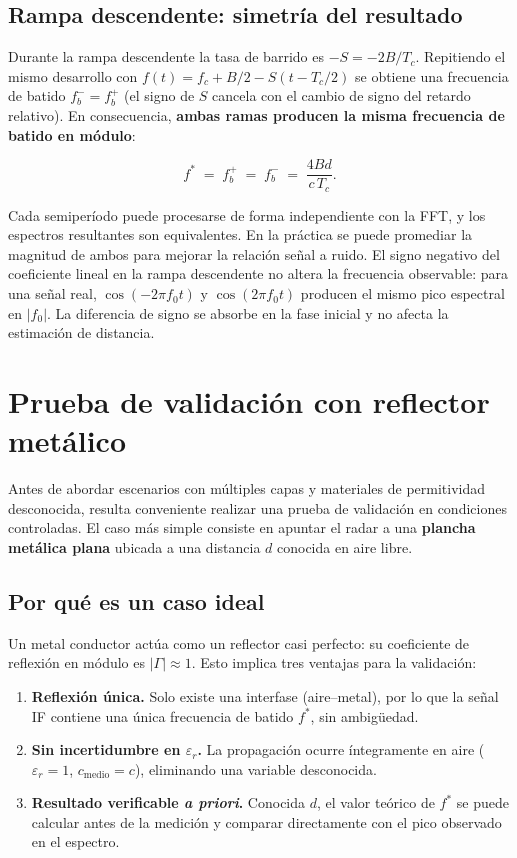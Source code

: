 \documentclass[12pt, a4paper, twoside]{report}
\begin{document}
\subsection*{Rampa descendente: simetría del resultado}

Durante la rampa descendente la tasa de barrido es $-S = -2B/T_c$.
Repitiendo el mismo desarrollo con $f(t) = f_c + B/2 - S(t-T_c/2)$
se obtiene una frecuencia de batido $f_b^- = f_b^+$ (el signo de $S$
cancela con el cambio de signo del retardo relativo). En consecuencia,
\textbf{ambas ramas producen la misma frecuencia de batido en módulo}:

\begin{equation}
  \boxed{
    f^* \;=\; f_b^+ \;=\; f_b^- \;=\; \frac{4Bd}{c\,T_c}.
  }
  \label{eq:beat_freq}
\end{equation}

Cada semiperíodo puede procesarse de forma independiente con
la FFT, y los espectros resultantes son equivalentes.
En la práctica se puede promediar la magnitud de ambos para
mejorar la relación señal a ruido.
El signo negativo del coeficiente lineal en la rampa descendente no altera la frecuencia observable: para una señal real, $\cos(-2\pi f_0 t)$ y $\cos(2\pi f_0 t)$ producen el mismo pico espectral en $\lvert f_0 \rvert$. La diferencia de signo se absorbe en la fase inicial y no afecta la estimación de distancia.

\section{Prueba de validación con reflector metálico}
\label{sec:prueba_metalica}

Antes de abordar escenarios con múltiples capas y materiales de
permitividad desconocida, resulta conveniente realizar una prueba
de validación en condiciones controladas. El caso más simple consiste
en apuntar el radar a una \textbf{plancha metálica plana} ubicada a
una distancia $d$ conocida en aire libre.

\subsection{Por qué es un caso ideal}

Un metal conductor actúa como un reflector casi perfecto: su
coeficiente de reflexión en módulo es $|\Gamma| \approx 1$. Esto
implica tres ventajas para la validación:

\begin{enumerate}
  \item \textbf{Reflexión única.} Solo existe una interfase
    (aire--metal), por lo que la señal IF contiene una única
    frecuencia de batido $f^*$, sin ambigüedad.
  \item \textbf{Sin incertidumbre en $\varepsilon_r$.} La propagación
    ocurre íntegramente en aire ($\varepsilon_r = 1$,
    $c_\text{medio} = c$), eliminando una variable desconocida.
  \item \textbf{Resultado verificable \textit{a priori}.} Conocida $d$,
    el valor teórico de $f^*$ se puede calcular antes de la medición
    y comparar directamente con el pico observado en el espectro.
\end{enumerate}
\end{document}
